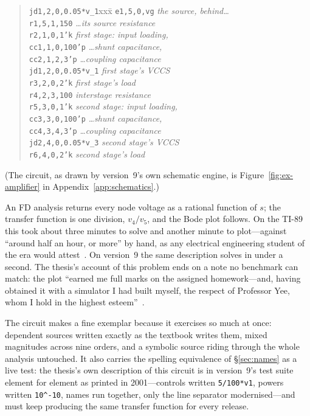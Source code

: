 \documentclass[11pt,oneside]{report}
\newcommand{\code}[1]{\texttt{#1}}
\begin{document}
\begin{quote}
\begin{tabbing}
\code{jd1,2,0,0.05*v\_1}xxx\=\kill
\code{e1,5,0,vg}          \> \emph{the source, behind\ldots} \\
\code{r1,5,1,150}         \> \emph{\ldots its source resistance} \\
\code{r2,1,0,1'k}         \> \emph{first stage: input loading,} \\
\code{cc1,1,0,100'p}      \> \emph{\ldots shunt capacitance,} \\
\code{cc2,1,2,3'p}        \> \emph{\ldots coupling capacitance} \\
\code{jd1,2,0,0.05*v\_1}  \> \emph{first stage's VCCS} \\
\code{r3,2,0,2'k}         \> \emph{first stage's load} \\
\code{r4,2,3,100}         \> \emph{interstage resistance} \\
\code{r5,3,0,1'k}         \> \emph{second stage: input loading,} \\
\code{cc3,3,0,100'p}      \> \emph{\ldots shunt capacitance,} \\
\code{cc4,3,4,3'p}        \> \emph{\ldots coupling capacitance} \\
\code{jd2,4,0,0.05*v\_3}  \> \emph{second stage's VCCS} \\
\code{r6,4,0,2'k}         \> \emph{second stage's load}
\end{tabbing}
\end{quote}

\noindent (The circuit, as drawn by version~9's own schematic
engine, is Figure~\ref{fig:ex-amplifier} in
Appendix~\ref{app:schematics}.)

An FD analysis returns every node voltage as a rational function of
$s$; the transfer function is one division, $v_4/v_5$, and the Bode
plot follows. On the TI-89 this took about three minutes to solve and
another minute to plot---against ``around half an hour, or more''
by hand, as any electrical engineering student of the era would
attest~\cite{paper1999}. On version~9 the same description solves in
under a second. The thesis's account of this problem ends on a note
no benchmark can match: the plot ``earned me full marks on the
assigned homework---and, having obtained it with a simulator I had
built myself, the respect of Professor Yee, whom I hold in the
highest esteem''~\cite[\S12.2]{thesis2000}.

The circuit makes a fine exemplar because it exercises so much at
once: dependent sources written exactly as the textbook writes them,
mixed magnitudes across nine orders, and a symbolic source riding
through the whole analysis untouched. It also carries the spelling
equivalence of \S\ref{sec:names} as a live test: the thesis's own
description of this circuit is in version~9's test suite element for
element as printed in 2001---controls written \code{5/100*v1},
powers written \code{10\^{}-10}, names run together, only the line
separator modernised---and must keep producing the same transfer
function for every release.
\end{document}
